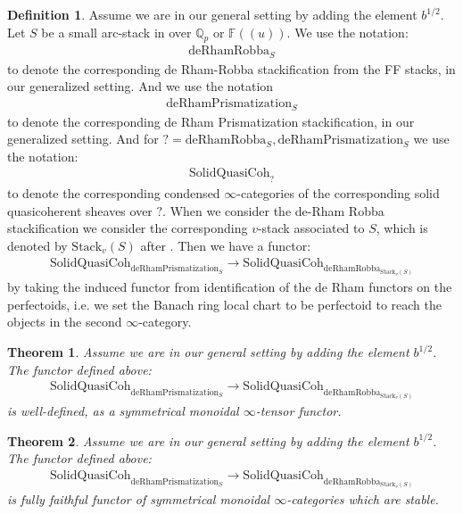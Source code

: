 \documentclass[12pt]{article}
\newtheorem{theorem}{Theorem}
\theoremstyle{definition}
\newtheorem{definition}{Definition}
\begin{document}
\begin{definition}
Assume we are in our general setting by adding the element $b^{1/2}$. Let $S$ be a small arc-stack in \cite{1S5} over $\mathbb{Q}_p$ or $\mathbb{F}((u))$. We use the notation:
\begin{align}
\mathrm{deRhamRobba}_S
\end{align}
to denote the corresponding de Rham-Robba stackification from the FF stacks, in our generalized setting. And we use the notation
\begin{align}
\mathrm{deRhamPrismatization}_S
\end{align}
to denote the corresponding de Rham Prismatization stackification, in our generalized setting. And for $?= \mathrm{deRhamRobba}_S, \mathrm{deRhamPrismatization}_S$ we use the notation:
\begin{align}
\mathrm{SolidQuasiCoh}_?
\end{align}
to denote the corresponding condensed $\infty$-categories of the corresponding solid quasicoherent sheaves over $?$. When we consider the de-Rham Robba stackification we consider the corresponding $v$-stack associated to $S$, which is denoted by $\mathrm{Stack}_v(S)$ after \cite{1S5}. Then we have a functor:
\begin{align}
\mathrm{SolidQuasiCoh}_{\mathrm{deRhamPrismatization}_S}\rightarrow \mathrm{SolidQuasiCoh}_{\mathrm{deRhamRobba}_{\mathrm{Stack}_v(S)}}
\end{align}
by taking the induced functor from identification of the de Rham functors on the perfectoids, i.e. we set the Banach ring local chart to be perfectoid to reach the objects in the second $\infty$-category. 
\end{definition}


\begin{theorem}
Assume we are in our general setting by adding the element $b^{1/2}$. The functor defined above:
\begin{align}
\mathrm{SolidQuasiCoh}_{\mathrm{deRhamPrismatization}_S}\longrightarrow \mathrm{SolidQuasiCoh}_{\mathrm{deRhamRobba}_{\mathrm{Stack}_v(S)}}
\end{align}
is well-defined, as a symmetrical monoidal $\infty$-tensor functor.
\end{theorem}



\begin{theorem}
Assume we are in our general setting by adding the element $b^{1/2}$. The functor defined above:
\begin{align}
\mathrm{SolidQuasiCoh}_{\mathrm{deRhamPrismatization}_S}\longrightarrow \mathrm{SolidQuasiCoh}_{\mathrm{deRhamRobba}_{\mathrm{Stack}_v(S)}}
\end{align}
is fully faithful functor of symmetrical monoidal $\infty$-categories which are stable. 
\end{theorem}
\end{document}
